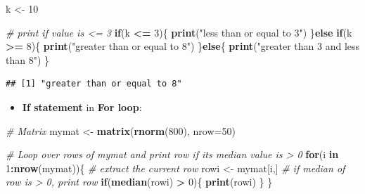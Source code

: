 \documentclass[]{book}
\newenvironment{Shaded}{\begin{snugshade}}{\end{snugshade}}
\newcommand{\CommentTok}[1]{\textcolor[rgb]{0.56,0.35,0.01}{\textit{#1}}}
\newcommand{\ControlFlowTok}[1]{\textcolor[rgb]{0.13,0.29,0.53}{\textbf{#1}}}
\newcommand{\DataTypeTok}[1]{\textcolor[rgb]{0.13,0.29,0.53}{#1}}
\newcommand{\DecValTok}[1]{\textcolor[rgb]{0.00,0.00,0.81}{#1}}
\newcommand{\KeywordTok}[1]{\textcolor[rgb]{0.13,0.29,0.53}{\textbf{#1}}}
\newcommand{\NormalTok}[1]{#1}
\newcommand{\OperatorTok}[1]{\textcolor[rgb]{0.81,0.36,0.00}{\textbf{#1}}}
\newcommand{\StringTok}[1]{\textcolor[rgb]{0.31,0.60,0.02}{#1}}
\providecommand{\tightlist}{%
  \setlength{\itemsep}{0pt}\setlength{\parskip}{0pt}}
\begin{document}
\begin{Shaded}
\begin{Highlighting}[]
\NormalTok{k <-}\StringTok{ }\DecValTok{10}

\CommentTok{# print if value is <= 3}
\ControlFlowTok{if}\NormalTok{(k }\OperatorTok{<=}\StringTok{ }\DecValTok{3}\NormalTok{)\{}
  \KeywordTok{print}\NormalTok{(}\StringTok{"less than or equal to 3"}\NormalTok{)}
\NormalTok{\}}\ControlFlowTok{else} \ControlFlowTok{if}\NormalTok{(k }\OperatorTok{>=}\StringTok{ }\DecValTok{8}\NormalTok{)\{}
  \KeywordTok{print}\NormalTok{(}\StringTok{"greater than or equal to 8"}\NormalTok{)}
\NormalTok{\}}\ControlFlowTok{else}\NormalTok{\{}
  \KeywordTok{print}\NormalTok{(}\StringTok{"greater than 3 and less than 8"}\NormalTok{)}
\NormalTok{\}}
\end{Highlighting}
\end{Shaded}

\begin{verbatim}
## [1] "greater than or equal to 8"
\end{verbatim}

\begin{itemize}
\tightlist
\item
  \textbf{If statement} in \textbf{For loop}:
\end{itemize}

\begin{Shaded}
\begin{Highlighting}[]
\CommentTok{# Matrix}
\NormalTok{mymat <-}\StringTok{ }\KeywordTok{matrix}\NormalTok{(}\KeywordTok{rnorm}\NormalTok{(}\DecValTok{800}\NormalTok{), }
        \DataTypeTok{nrow=}\DecValTok{50}\NormalTok{)}
    
\CommentTok{# Loop over rows of mymat and print row if its median value is > 0}
\ControlFlowTok{for}\NormalTok{(i }\ControlFlowTok{in} \DecValTok{1}\OperatorTok{:}\KeywordTok{nrow}\NormalTok{(mymat))\{}
    \CommentTok{# extract the current row}
\NormalTok{    rowi <-}\StringTok{ }\NormalTok{mymat[i,]}
    \CommentTok{# if median of row is > 0, print row}
    \ControlFlowTok{if}\NormalTok{(}\KeywordTok{median}\NormalTok{(rowi) }\OperatorTok{>}\StringTok{ }\DecValTok{0}\NormalTok{)\{}
        \KeywordTok{print}\NormalTok{(rowi)}
\NormalTok{    \}}
\NormalTok{\}}
\end{Highlighting}
\end{Shaded}
\end{document}
